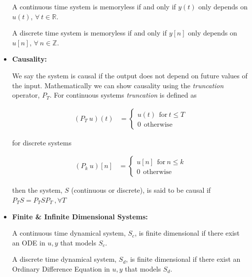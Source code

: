 \documentclass[12pt,oneside]{amsart}
\begin{document}
\begin{itemize}
A continuous time system is memoryless if and
only if $y(t)$ only depends on $u(t)$, $\forall \ t \in \mathbb{R}$.

\vspace{6pt}

A discrete time system is memoryless if and
only if $y[n]$ only depends on $u[n]$, $\forall \ n \in \mathbb{Z}$.

\vspace{12pt}

\item \textbf{Causality:}

\vspace{6pt}

We say the system is causal if the output does not depend on future
values of the input. Mathematically we can show causality using the
\textit{truncation} operator, $P_T$. For continuous systems
\textit{truncation} is defined as

\begin{align*}
(P_T \ u ) (t) &= \left\lbrace \begin{array}{c} u(t) \ \ \mathrm{for}
                                  \ t \leq T 
\\ 0 \ \ \mathrm{otherwise} \end{array} \right. 
\end{align*}

for discrete systems

\begin{align*}
(P_k \ u ) [n] &= \left\lbrace \begin{array}{c} u[n] \ \ \mathrm{for}
                                  \ n \leq k \\ 0 \ \ \mathrm{otherwise} \end{array} \right. 
\end{align*}

\vspace{6pt}

then the system, $S$ (continuous or discrete), is said to be causal if
$P_T S = P_T S P_T \ , \forall T$

\vspace{12pt}

\item \textbf{Finite \& Infinite Dimensional Systems:}

\vspace{6pt}

A continuous time dynamical system, $S_c$, is finite dimensional 
if there exist an ODE in $u,y$ that models $S_c$.

\vspace{6pt}

A discrete time dynamical system, $S_d$, is finite dimensional 
if there exist an Ordinary Difference Equation in $u,y$ that models $S_d$.

\end{itemize}
\end{document}
